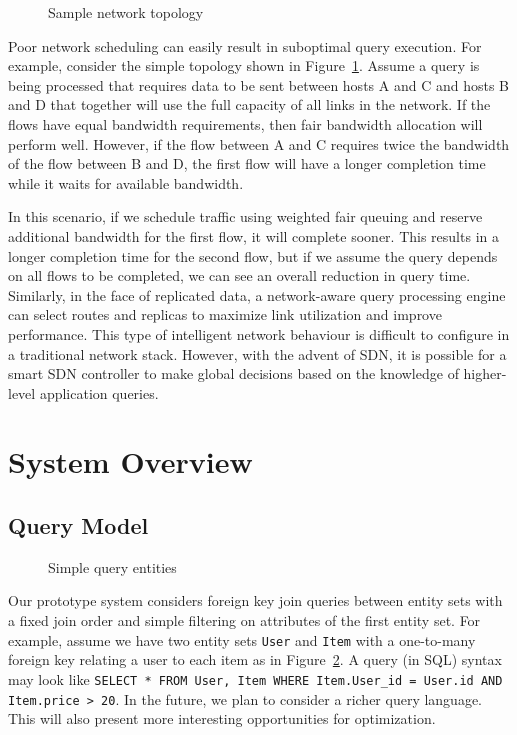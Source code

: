 \documentclass{sig-alternate-2013}
\begin{document}
\begin{figure}
    \centering
    \caption{Sample network topology}\label{fig:sample-topology}
\end{figure}

Poor network scheduling can easily result in suboptimal query execution.
For example, consider the simple topology shown in Figure~\ref{fig:sample-topology}.
Assume a query is being processed that requires data to be sent between hosts A and C and hosts B and D that together will use the full capacity of all links in the network.
If the flows have equal bandwidth requirements, then fair bandwidth allocation will perform well.
However, if the flow between A and C requires twice the bandwidth of the flow between B and D, the first flow will have a longer completion time while it waits for available bandwidth.

In this scenario, if we schedule traffic using weighted fair queuing and reserve additional bandwidth for the first flow, it will complete sooner.
This results in a longer completion time for the second flow, but if we assume the query depends on all flows to be completed, we can see an overall reduction in query time.
Similarly, in the face of replicated data, a network-aware query processing engine can select routes and replicas to maximize link utilization and improve performance.
This type of intelligent network behaviour is difficult to configure in a traditional network stack.
However, with the advent of SDN, it is possible for a smart SDN controller to make global decisions based on the knowledge of higher-level application queries.

\section{System Overview}

\subsection{Query Model}

\begin{figure}
    \centering
    \caption{Simple query entities}\label{fig:entities}
\end{figure}

Our prototype system considers foreign key join queries between entity sets with a fixed join order and simple filtering on attributes of the first entity set.
For example, assume we have two entity sets \texttt{User} and \texttt{Item} with a one-to-many foreign key relating a user to each item as in Figure~\ref{fig:entities}.
A query (in SQL) syntax may look like \texttt{SELECT * FROM User, Item WHERE Item.User\_id = User.id AND Item.price > 20}.
In the future, we plan to consider a richer query language.
This will also present more interesting opportunities for optimization.
\end{document}
